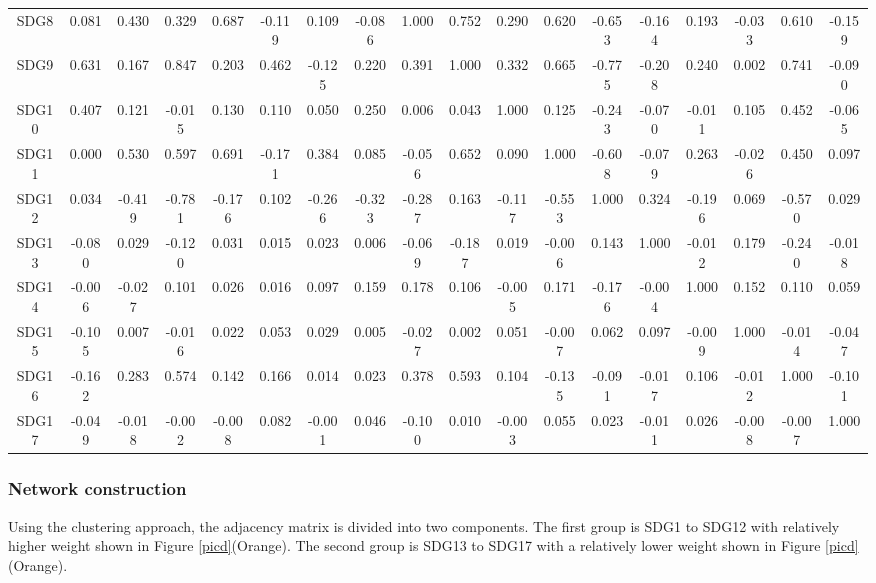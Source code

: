 \documentclass[10pt]{mcmthesis}
\begin{document}
\begin{table}[h]
\begin{tabular}{c|ccccccccccccccccc}
SDG8  & 0.081  & 0.430  & 0.329  & 0.687  & -0.119 & 0.109  & -0.086 & 1.000  & 0.752  & 0.290  & 0.620  & -0.653 & -0.164 & 0.193  & -0.033 & 0.610  & -0.159 \\
SDG9  & 0.631  & 0.167  & 0.847  & 0.203  & 0.462  & -0.125 & 0.220  & 0.391  & 1.000  & 0.332  & 0.665  & -0.775 & -0.208 & 0.240  & 0.002  & 0.741  & -0.090 \\
SDG10 & 0.407  & 0.121  & -0.015 & 0.130  & 0.110  & 0.050  & 0.250  & 0.006  & 0.043  & 1.000  & 0.125  & -0.243 & -0.070 & -0.011 & 0.105  & 0.452  & -0.065 \\
SDG11 & 0.000  & 0.530  & 0.597  & 0.691  & -0.171 & 0.384  & 0.085  & -0.056 & 0.652  & 0.090  & 1.000  & -0.608 & -0.079 & 0.263  & -0.026 & 0.450  & 0.097  \\
SDG12 & 0.034  & -0.419 & -0.781 & -0.176 & 0.102  & -0.266 & -0.323 & -0.287 & 0.163  & -0.117 & -0.553 & 1.000  & 0.324  & -0.196 & 0.069  & -0.570 & 0.029  \\
SDG13 & -0.080 & 0.029  & -0.120 & 0.031  & 0.015  & 0.023  & 0.006  & -0.069 & -0.187 & 0.019  & -0.006 & 0.143  & 1.000  & -0.012 & 0.179  & -0.240 & -0.018 \\
SDG14 & -0.006 & -0.027 & 0.101  & 0.026  & 0.016  & 0.097  & 0.159  & 0.178  & 0.106  & -0.005 & 0.171  & -0.176 & -0.004 & 1.000  & 0.152  & 0.110  & 0.059  \\
SDG15 & -0.105 & 0.007  & -0.016 & 0.022  & 0.053  & 0.029  & 0.005  & -0.027 & 0.002  & 0.051  & -0.007 & 0.062  & 0.097  & -0.009 & 1.000  & -0.014 & -0.047 \\
SDG16 & -0.162 & 0.283  & 0.574  & 0.142  & 0.166  & 0.014  & 0.023  & 0.378  & 0.593  & 0.104  & -0.135 & -0.091 & -0.017 & 0.106  & -0.012 & 1.000  & -0.101 \\
SDG17 & -0.049 & -0.018 & -0.002 & -0.008 & 0.082  & -0.001 & 0.046  & -0.100 & 0.010  & -0.003 & 0.055  & 0.023  & -0.011 & 0.026  & -0.008 & -0.007 & 1.000  \\ \hline
\end{tabular}
\end{table}




\subsubsection{Network construction }

Using the clustering approach, the adjacency matrix is divided into two components. 
The first group is SDG1 to SDG12 with relatively higher weight shown in Figure \ref{picd}(Orange). The second group is SDG13 to SDG17 with a relatively lower weight shown in Figure \ref{picd}(Orange).
\end{document}
